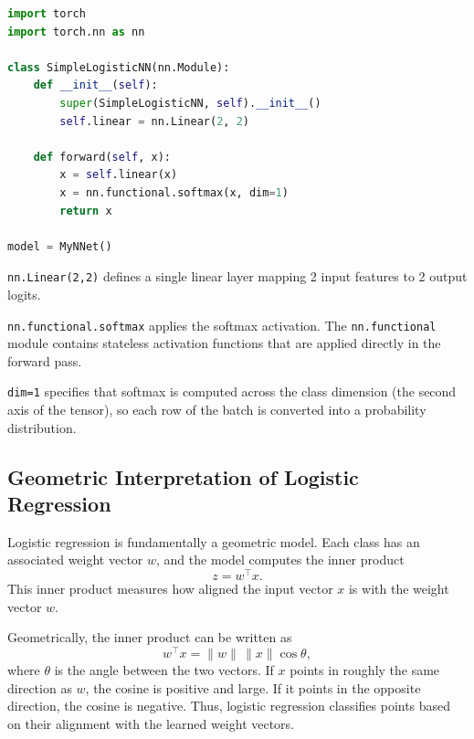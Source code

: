 \noindent
\begin{minipage}[t]{0.55\textwidth}
\vspace{0pt}

\begin{lstlisting}[language=Python]
import torch
import torch.nn as nn

class SimpleLogisticNN(nn.Module):
    def __init__(self):
        super(SimpleLogisticNN, self).__init__()
        self.linear = nn.Linear(2, 2)

    def forward(self, x):
        x = self.linear(x)
        x = nn.functional.softmax(x, dim=1)
        return x

model = MyNNet()
\end{lstlisting}

\end{minipage}
\hspace{1em}
\begin{minipage}[t]{0.4\textwidth}
\vspace{0pt}
\raggedright

\texttt{nn.Linear(2,2)} defines a single linear layer mapping 2 input features to 2 output logits.

\medskip

\texttt{nn.functional.softmax} applies the softmax activation. The \texttt{nn.functional} module contains stateless activation functions that are applied directly in the forward pass.

\medskip

\texttt{dim=1} specifies that softmax is computed across the class dimension (the second axis of the tensor), so each row of the batch is converted into a probability distribution.

\end{minipage}

\bigskip

\subsection{Geometric Interpretation of Logistic Regression}

\medskip

Logistic regression is fundamentally a geometric model.  
Each class has an associated weight vector $w$, and the model computes the inner product
\[
z = w^\top x.
\]
This inner product measures how aligned the input vector $x$ is with the weight vector $w$.

\medskip

Geometrically, the inner product can be written as
\[
w^\top x = \|w\|\,\|x\|\cos\theta,
\]
where $\theta$ is the angle between the two vectors.  
If $x$ points in roughly the same direction as $w$, the cosine is positive and large.  
If it points in the opposite direction, the cosine is negative.  
Thus, logistic regression classifies points based on their alignment with the learned weight vectors.

